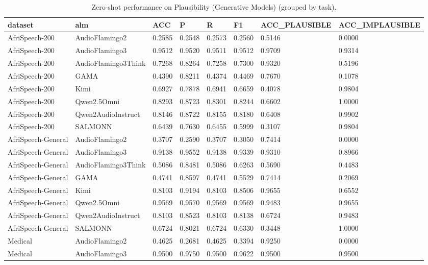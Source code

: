 \begin{table}
\caption{Zero-shot performance on Plausibility (Generative Models) (grouped by task).}
\label{tab:plausibility_generative_models_results}
\begin{tabular}{llllllll}
\toprule
dataset & alm & ACC & P & R & F1 & ACC\_PLAUSIBLE & ACC\_IMPLAUSIBLE \\
\midrule
AfriSpeech-200 & AudioFlamingo2 & 0.2585 & 0.2548 & 0.2573 & 0.2560 & 0.5146 & 0.0000 \\
AfriSpeech-200 & AudioFlamingo3 & 0.9512 & 0.9520 & 0.9511 & 0.9512 & 0.9709 & 0.9314 \\
AfriSpeech-200 & AudioFlamingo3Think & 0.7268 & 0.8264 & 0.7258 & 0.7300 & 0.9320 & 0.5196 \\
AfriSpeech-200 & GAMA & 0.4390 & 0.8211 & 0.4374 & 0.4469 & 0.7670 & 0.1078 \\
AfriSpeech-200 & Kimi & 0.6927 & 0.7878 & 0.6941 & 0.6659 & 0.4078 & 0.9804 \\
AfriSpeech-200 & Qwen2.5Omni & 0.8293 & 0.8723 & 0.8301 & 0.8244 & 0.6602 & 1.0000 \\
AfriSpeech-200 & Qwen2AudioInstruct & 0.8146 & 0.8722 & 0.8155 & 0.8180 & 0.6408 & 0.9902 \\
AfriSpeech-200 & SALMONN & 0.6439 & 0.7630 & 0.6455 & 0.5999 & 0.3107 & 0.9804 \\
AfriSpeech-General & AudioFlamingo2 & 0.3707 & 0.2590 & 0.3707 & 0.3050 & 0.7414 & 0.0000 \\
AfriSpeech-General & AudioFlamingo3 & 0.9138 & 0.9552 & 0.9138 & 0.9339 & 0.9310 & 0.8966 \\
AfriSpeech-General & AudioFlamingo3Think & 0.5086 & 0.8481 & 0.5086 & 0.6263 & 0.5690 & 0.4483 \\
AfriSpeech-General & GAMA & 0.4741 & 0.8597 & 0.4741 & 0.5529 & 0.7414 & 0.2069 \\
AfriSpeech-General & Kimi & 0.8103 & 0.9194 & 0.8103 & 0.8506 & 0.9655 & 0.6552 \\
AfriSpeech-General & Qwen2.5Omni & 0.9569 & 0.9570 & 0.9569 & 0.9569 & 0.9483 & 0.9655 \\
AfriSpeech-General & Qwen2AudioInstruct & 0.8103 & 0.8523 & 0.8103 & 0.8138 & 0.6724 & 0.9483 \\
AfriSpeech-General & SALMONN & 0.6724 & 0.8021 & 0.6724 & 0.6330 & 0.3448 & 1.0000 \\
Medical & AudioFlamingo2 & 0.4625 & 0.2681 & 0.4625 & 0.3394 & 0.9250 & 0.0000 \\
Medical & AudioFlamingo3 & 0.9500 & 0.9750 & 0.9500 & 0.9622 & 0.9500 & 0.9500 \\

\end{tabular}
\end{table}
